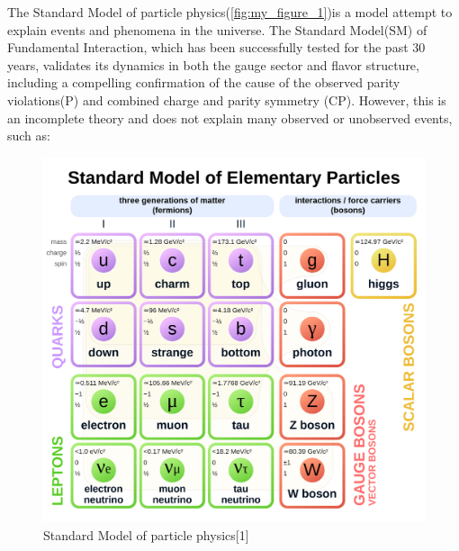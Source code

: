 The Standard Model of particle physics(\autoref{fig:my_figure_1})is a model attempt to explain  events and phenomena in the universe. The Standard Model(SM) of Fundamental Interaction, which has  been successfully tested for the past 30 years, validates its dynamics in both  the gauge sector and  flavor structure, including a compelling confirmation of the cause of the observed parity violations(P) and combined charge and parity symmetry (CP). However, this is an incomplete theory and does not explain many  observed or unobserved events, such as:
\begin{figure}[H]
    \centering
    \includegraphics[scale =0.1]{figure_1/Standard_Model_of_Elementary_Particles.svg.png}
    \caption{Standard Model of particle physics[1]}
    \label{fig:my_figure_1}
\end{figure}
